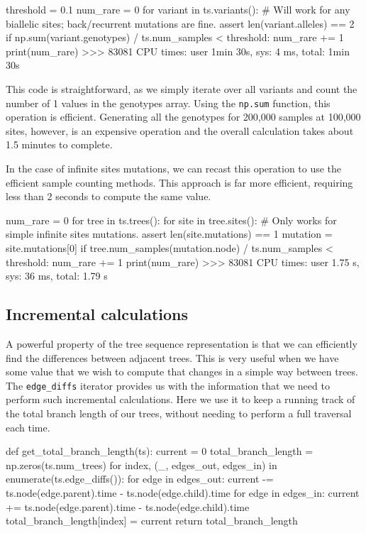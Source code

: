 \documentclass[graybox]{svmult}
\begin{document}
\begin{pythoncode}
threshold = 0.1
num_rare = 0
for variant in ts.variants():
    # Will work for any biallelic sites; back/recurrent mutations are fine.
    assert len(variant.alleles) == 2
    if np.sum(variant.genotypes) / ts.num_samples < threshold:
        num_rare += 1
print(num_rare)
>>> 83081
CPU times: user 1min 30s, sys: 4 ms, total: 1min 30s
\end{pythoncode}

This code is straightforward, as we simply iterate over all variants and
count the number of 1 values in the genotypes array. Using the \texttt{np.sum}
function, this operation is efficient. Generating all the genotypes for
200,000 samples at 100,000 sites, however,
is an expensive operation and the overall calculation takes about 1.5 minutes
to complete.

In the case of infinite sites mutations, we can recast this operation
to use the efficient sample counting methods. This approach is far more
efficient, requiring less than 2 seconds to compute the same value.
\begin{pythoncode}
num_rare = 0
for tree in ts.trees():
    for site in tree.sites():
        # Only works for simple infinite sites mutations.
        assert len(site.mutations) == 1
        mutation = site.mutations[0]
        if tree.num_samples(mutation.node) / ts.num_samples < threshold:
            num_rare += 1
print(num_rare)
>>> 83081
CPU times: user 1.75 s, sys: 36 ms, total: 1.79 s
\end{pythoncode}

\subsection{Incremental calculations}\label{incremental-calculations}

A powerful property of the tree sequence representation is that we can
efficiently find the differences between adjacent trees. This is very
useful when we have some value that we wish to compute that changes in a
simple way between trees. The \texttt{edge\_diffs} iterator provides us
with the information that we need to perform such incremental
calculations. Here we use it to keep a running track of the total branch
length of our trees, without needing to perform a full traversal each
time.

\begin{pythoncode}
def get_total_branch_length(ts):
    current = 0
    total_branch_length = np.zeros(ts.num_trees)
    for index, (_, edges_out, edges_in) in enumerate(ts.edge_diffs()):
        for edge in edges_out:
            current -= ts.node(edge.parent).time - ts.node(edge.child).time
        for edge in edges_in:
            current += ts.node(edge.parent).time - ts.node(edge.child).time
        total_branch_length[index] = current
    return total_branch_length
\end{pythoncode}
\end{document}
